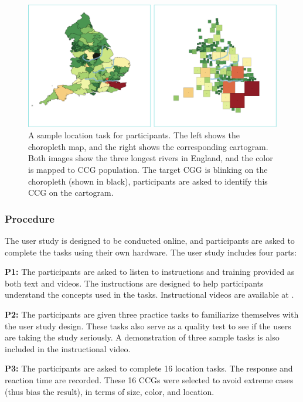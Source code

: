 {
\begin{figure}[tb!]
    \centering
    \includegraphics[width=\columnwidth,keepaspectratio]{figure/evaluation/task.png}
    \caption{A sample location task for participants. The left shows the choropleth map, and the right shows the corresponding cartogram. Both images show the three longest rivers in England, and the color is mapped to CCG population. The target CGG is blinking on the choropleth (shown in black), participants are asked to identify this CCG on the cartogram.}
    \label{fig:task}
\end{figure}
}

\subsubsection{Procedure}

The user study is designed to be conducted online, and participants are asked to complete the tasks using their own hardware. The user study includes four parts:

\textbf{P1:} The participants are asked to listen to instructions and training provided as both text and videos. The instructions are designed to help participants understand the concepts used in the tasks. Instructional videos are available at .

\textbf{P2:} The participants are given three practice tasks to familiarize themselves with the user study design. These tasks also serve as a quality test to see if the users are taking the study seriously. A demonstration of three sample tasks is also included in the instructional video.

\textbf{P3:} The participants are asked to complete 16 location tasks. The response and reaction time are recorded. These 16 CCGs were selected to avoid extreme cases (thus bias the result), in terms of size, color, and location.

